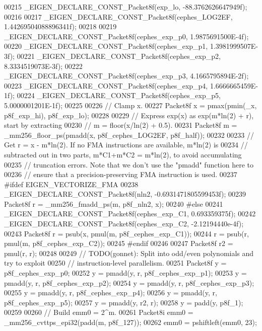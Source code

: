 \begin{DoxyCode}
00215   \_EIGEN\_DECLARE\_CONST\_Packet8f(exp\_lo, -88.3762626647949f);
00216 
00217   \_EIGEN\_DECLARE\_CONST\_Packet8f(cephes\_LOG2EF, 1.44269504088896341f);
00218 
00219   \_EIGEN\_DECLARE\_CONST\_Packet8f(cephes\_exp\_p0, 1.9875691500E-4f);
00220   \_EIGEN\_DECLARE\_CONST\_Packet8f(cephes\_exp\_p1, 1.3981999507E-3f);
00221   \_EIGEN\_DECLARE\_CONST\_Packet8f(cephes\_exp\_p2, 8.3334519073E-3f);
00222   \_EIGEN\_DECLARE\_CONST\_Packet8f(cephes\_exp\_p3, 4.1665795894E-2f);
00223   \_EIGEN\_DECLARE\_CONST\_Packet8f(cephes\_exp\_p4, 1.6666665459E-1f);
00224   \_EIGEN\_DECLARE\_CONST\_Packet8f(cephes\_exp\_p5, 5.0000001201E-1f);
00225 
00226   \textcolor{comment}{// Clamp x.}
00227   Packet8f x = pmax(pmin(\_x, p8f\_exp\_hi), p8f\_exp\_lo);
00228 
00229   \textcolor{comment}{// Express exp(x) as exp(m*ln(2) + r), start by extracting}
00230   \textcolor{comment}{// m = floor(x/ln(2) + 0.5).}
00231   Packet8f m = \_mm256\_floor\_ps(pmadd(x, p8f\_cephes\_LOG2EF, p8f\_half));
00232 
00233 \textcolor{comment}{// Get r = x - m*ln(2). If no FMA instructions are available, m*ln(2) is}
00234 \textcolor{comment}{// subtracted out in two parts, m*C1+m*C2 = m*ln(2), to avoid accumulating}
00235 \textcolor{comment}{// truncation errors. Note that we don't use the "pmadd" function here to}
00236 \textcolor{comment}{// ensure that a precision-preserving FMA instruction is used.}
00237 \textcolor{preprocessor}{#ifdef EIGEN\_VECTORIZE\_FMA}
00238   \_EIGEN\_DECLARE\_CONST\_Packet8f(nln2, -0.6931471805599453f);
00239   Packet8f r = \_mm256\_fmadd\_ps(m, p8f\_nln2, x);
00240 \textcolor{preprocessor}{#else}
00241   \_EIGEN\_DECLARE\_CONST\_Packet8f(cephes\_exp\_C1, 0.693359375f);
00242   \_EIGEN\_DECLARE\_CONST\_Packet8f(cephes\_exp\_C2, -2.12194440e-4f);
00243   Packet8f r = psub(x, pmul(m, p8f\_cephes\_exp\_C1));
00244   r = psub(r, pmul(m, p8f\_cephes\_exp\_C2));
00245 \textcolor{preprocessor}{#endif}
00246 
00247   Packet8f r2 = pmul(r, r);
00248 
00249   \textcolor{comment}{// TODO(gonnet): Split into odd/even polynomials and try to exploit}
00250   \textcolor{comment}{//               instruction-level parallelism.}
00251   Packet8f y = p8f\_cephes\_exp\_p0;
00252   y = pmadd(y, r, p8f\_cephes\_exp\_p1);
00253   y = pmadd(y, r, p8f\_cephes\_exp\_p2);
00254   y = pmadd(y, r, p8f\_cephes\_exp\_p3);
00255   y = pmadd(y, r, p8f\_cephes\_exp\_p4);
00256   y = pmadd(y, r, p8f\_cephes\_exp\_p5);
00257   y = pmadd(y, r2, r);
00258   y = padd(y, p8f\_1);
00259 
00260   \textcolor{comment}{// Build emm0 = 2^m.}
00261   Packet8i emm0 = \_mm256\_cvttps\_epi32(padd(m, p8f\_127));
00262   emm0 = pshiftleft(emm0, 23);

\end{DoxyCode}
